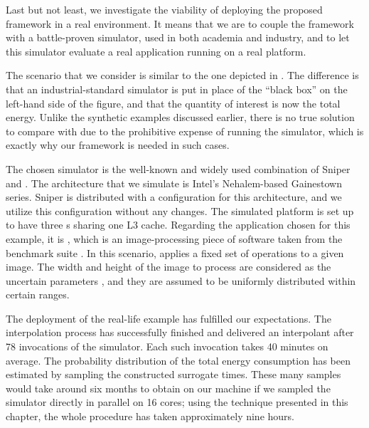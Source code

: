 Last but not least, we investigate the viability of deploying the proposed
framework in a real environment. It means that we are to couple the framework
with a battle-proven simulator, used in both academia and industry, and to let
this simulator evaluate a real application running on a real platform.

The scenario that we consider is similar to the one depicted in
. The difference is that an industrial-standard
simulator is put in place of the ``black box'' on the left-hand side of the
figure, and that the quantity of interest \g is now the total energy. Unlike the
synthetic examples discussed earlier, there is no true solution to compare with
due to the prohibitive expense of running the simulator, which is exactly why
our framework is needed in such cases.

The chosen simulator is the well-known and widely used combination of Sniper
\cite{carlson2011} and  \cite{li2009}. The architecture that we
simulate is Intel's Nehalem-based Gainestown series. Sniper is distributed with
a configuration for this architecture, and we utilize this configuration without
any changes. The simulated platform is set up to have three s sharing
one L3 cache. Regarding the application chosen for this example, it is
, which is an image-processing piece of software taken from the
 benchmark suite \cite{bienia2011}. In this scenario, 
applies a fixed set of operations to a given image. The width and height of the
image to process are considered as the uncertain parameters \vu, and they are
assumed to be uniformly distributed within certain ranges.

The deployment of the real-life example has fulfilled our expectations. The
interpolation process has successfully finished and delivered an interpolant
after 78 invocations of the simulator. Each such invocation takes 40 minutes on
average. The probability distribution of the total energy consumption has been
estimated by sampling the constructed surrogate  times. These many
samples would take around six months to obtain on our machine if we sampled the
simulator directly in parallel on 16 cores; using the technique presented in
this chapter, the whole procedure has taken approximately nine hours.
